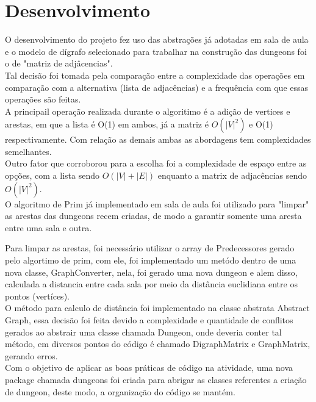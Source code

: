 \documentclass[a4paper, 12pt]{article}
\begin{document}
\newpage
\section{Desenvolvimento}

O desenvolvimento do projeto fez uso das abstrações já adotadas em sala de aula e o modelo de dígrafo selecionado para trabalhar na construção das dungeons foi o de "matriz de adjâcencias".\\

Tal decisão foi tomada pela comparação entre a complexidade das operações em comparação com a alternativa (lista de adjacências) e a frequência com que essas operações são feitas.\\
A principail operação realizada durante o algoritimo é a adição de vertices e arestas, em que a lista é O(1) em ambos, já a matriz é $O(|V|^2)$ e O(1) respectivamente. Com relação as demais ambas as abordagens tem complexidades semelhantes.\\
Outro fator que corroborou para a escolha foi a complexidade de espaço entre as opções, com a lista sendo $O(|V|+|E|)$ enquanto a matrix de adjacências sendo $O(|V|^2)$.\\

O algoritmo de Prim já implementado em sala de aula foi utilizado para "limpar" as arestas das dungeons recem criadas, de modo a garantir somente uma aresta entre uma sala e outra.

Para limpar as arestas, foi necessário utilizar o array de Predecessores gerado pelo algortimo de prim, com ele, foi implementado um metódo dentro de uma nova classe, GraphConverter, nela, foi gerado uma nova dungeon e alem disso, calculada a distancia entre cada sala por meio da distância euclidiana entre os pontos (vertíces).\\

O método para calculo de distância foi implementado na classe abstrata Abstract Graph, essa decisão foi feita devido a complexidade e quantidade de conflitos gerados ao abstrair uma classe chamada Dungeon, onde deveria conter tal método, em diversos pontos do código é chamado DigraphMatrix e GraphMatrix, gerando erros.\\


Com o objetivo de aplicar as boas práticas de código na atividade, uma nova package chamada dungeons foi criada para abrigar as classes referentes a criação de dungeon, deste modo, a organização do código se mantém.\\
\end{document}
